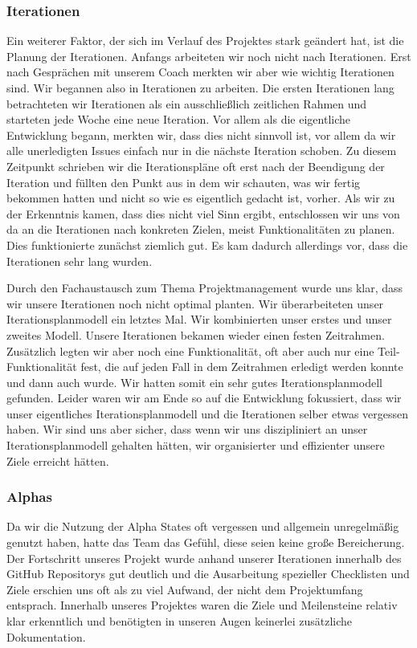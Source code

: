 \documentclass[10pt]{article}
\begin{document}
\subsubsection{Iterationen}
Ein weiterer Faktor, der sich im Verlauf des Projektes stark geändert hat, ist die Planung der Iterationen.
Anfangs arbeiteten wir noch nicht nach Iterationen. Erst nach Gesprächen mit unserem Coach merkten wir aber
wie wichtig Iterationen sind. Wir begannen also in Iterationen zu arbeiten. Die ersten Iterationen lang
betrachteten wir Iterationen als ein ausschließlich zeitlichen Rahmen und starteten jede Woche eine neue Iteration.
Vor allem als die eigentliche Entwicklung begann, merkten wir, dass dies nicht sinnvoll ist, vor allem
da wir alle unerledigten Issues einfach nur in die nächste Iteration schoben. Zu diesem Zeitpunkt schrieben wir
die Iterationspläne oft erst nach der Beendigung der Iteration und füllten den Punkt  aus in dem
wir schauten, was wir fertig bekommen hatten und nicht so wie es eigentlich gedacht ist, vorher.
Als wir zu der Erkenntnis kamen, dass dies nicht viel Sinn ergibt, entschlossen wir uns von da an
die Iterationen nach konkreten Zielen, meist Funktionalitäten zu planen. Dies funktionierte zunächst ziemlich gut.
Es kam dadurch allerdings vor, dass die Iterationen sehr lang wurden.\par
\medskip
Durch den Fachaustausch zum Thema Projektmanagement wurde uns klar, dass wir unsere Iterationen noch nicht optimal planten.
Wir überarbeiteten unser Iterationsplanmodell ein letztes Mal. Wir kombinierten unser erstes und unser zweites Modell.
Unsere Iterationen bekamen wieder einen festen Zeitrahmen. Zusätzlich legten wir aber noch eine Funktionalität, oft
aber auch nur eine Teil-Funktionalität fest, die auf jeden Fall in dem Zeitrahmen erledigt werden konnte und dann auch wurde.
Wir hatten somit ein sehr gutes Iterationsplanmodell gefunden. Leider waren wir am Ende so auf die
Entwicklung fokussiert, dass wir unser eigentliches Iterationsplanmodell und die Iterationen selber etwas vergessen
haben. Wir sind uns aber sicher, dass wenn wir uns diszipliniert an unser Iterationsplanmodell gehalten hätten,
wir organisierter und effizienter unsere Ziele erreicht hätten.

\subsubsection{Alphas}
Da wir die Nutzung der Alpha States oft vergessen und allgemein unregelmäßig genutzt haben, hatte das Team das Gefühl, diese seien 
keine große Bereicherung. Der Fortschritt unseres Projekt wurde anhand unserer Iterationen innerhalb des GitHub Repositorys gut deutlich und die
Ausarbeitung spezieller Checklisten und Ziele erschien uns oft als zu viel Aufwand, der nicht dem Projektumfang entsprach. Innerhalb unseres Projektes
waren die Ziele und Meilensteine relativ klar erkenntlich und benötigten in unseren Augen keinerlei zusätzliche Dokumentation.
\end{document}
